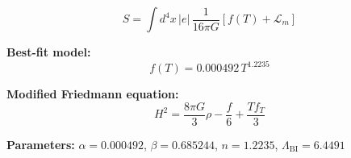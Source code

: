 
\begin{equation}
  S = \int d^4x \, |e| \, \frac{1}{16\pi G} \left[ f(T) + \mathcal{L}_m \right]
\end{equation}

\textbf{Best-fit model:}
\begin{equation}
  f(T) = 0.000492 \, T^{1.2235}
\end{equation}

\textbf{Modified Friedmann equation:}
\begin{equation}
  H^2 = \frac{8\pi G}{3} \rho - \frac{f}{6} + \frac{T f_T}{3}
\end{equation}

\textbf{Parameters:}
$\alpha = 0.000492$, \quad
$\beta = 0.685244$, \quad
$n = 1.2235$, \quad
$\Lambda_{\text{BI}} = 6.4491$